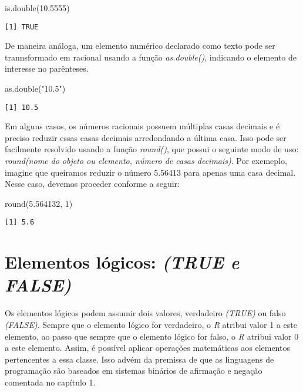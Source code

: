 \documentclass[
  letterpaper,
  DIV=11,
  numbers=noendperiod]{scrreprt}
\newenvironment{Shaded}{\begin{snugshade}}{\end{snugshade}}
\newcommand{\DecValTok}[1]{\textcolor[rgb]{0.68,0.00,0.00}{#1}}
\newcommand{\FloatTok}[1]{\textcolor[rgb]{0.68,0.00,0.00}{#1}}
\newcommand{\FunctionTok}[1]{\textcolor[rgb]{0.28,0.35,0.67}{#1}}
\newcommand{\NormalTok}[1]{\textcolor[rgb]{0.00,0.23,0.31}{#1}}
\newcommand{\StringTok}[1]{\textcolor[rgb]{0.13,0.47,0.30}{#1}}
\begin{document}
\begin{Shaded}
\begin{Highlighting}[]
\FunctionTok{is.double}\NormalTok{(}\FloatTok{10.5555}\NormalTok{)}
\end{Highlighting}
\end{Shaded}

\begin{verbatim}
[1] TRUE
\end{verbatim}

De maneira análoga, um elemento numérico declarado como texto pode ser
trannsformado em racional usando a função \emph{as.double()}, indicando
o elemento de interesse no parênteses.

\begin{Shaded}
\begin{Highlighting}[]
\FunctionTok{as.double}\NormalTok{(}\StringTok{"10.5"}\NormalTok{)}
\end{Highlighting}
\end{Shaded}

\begin{verbatim}
[1] 10.5
\end{verbatim}

Em alguns casos, os números racionais possuem múltiplas casas decimais e
é preciso reduzir essas casas decimais arredondando a última casa. Isso
pode ser facilmente resolvido usando a função \emph{round()}, que possui
o seguinte modo de uso: \emph{round(nome do objeto ou elemento, número
de casas decimais)}. Por exemeplo, imagine que queiramos reduzir o
número 5.56413 para apenas uma casa decimal. Nesse caso, devemos
proceder conforme a seguir:

\begin{Shaded}
\begin{Highlighting}[]
\FunctionTok{round}\NormalTok{(}\FloatTok{5.564132}\NormalTok{, }\DecValTok{1}\NormalTok{)}
\end{Highlighting}
\end{Shaded}

\begin{verbatim}
[1] 5.6
\end{verbatim}

\section{\texorpdfstring{Elementos lógicos: \emph{(TRUE e
FALSE)}}{Elementos lógicos: (TRUE e FALSE)}}\label{elementos-luxf3gicos-true-e-false}

Os elementos lógicos podem assumir dois valores, verdadeiro
\emph{(TRUE)} ou falso \emph{(FALSE)}. Sempre que o elemento lógico for
verdadeiro, o \emph{R} atribui valor 1 a este elemento, ao passo que
sempre que o elemento lógico for falso, o \emph{R} atribui valor 0 a
este elemento. Assim, é possível aplicar operações matemáticas aos
elementos pertencentes a essa classe. Isso advém da premissa de que as
linguagens de programação são baseados em sistemas binários de afirmação
e negação comentada no capítulo 1.
\end{document}
